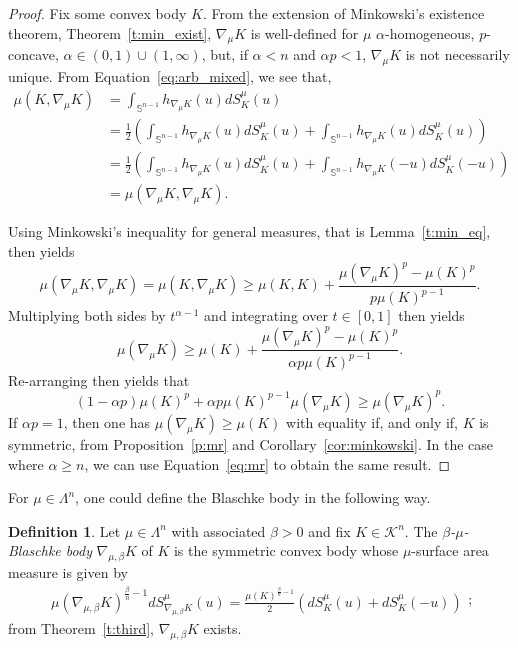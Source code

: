 \documentclass[11pt]{amsart}
\theoremstyle{definition}
\newtheorem{definition}[theorem]{Definition}
\theoremstyle{remark}
\numberwithin{equation}{section}
\newcommand{\s}{\mathbb{S}}
\newcommand{\conbod}{\mathcal{K}^n}
\begin{document}
\begin{proof} Fix some convex body $K$. From the extension of Minkowski's existence theorem, Theorem~\ref{t:min_exist}, $\nabla_\mu K$ is well-defined for $\mu$ $\alpha$-homogeneous, $p$-concave, $\alpha\in(0,1)\cup(1,\infty)$, but, if $\alpha<n$ and $\alpha p <1$, $\nabla_\mu K$ is not necessarily unique. 
From Equation~\ref{eq:arb_mixed}, we see that,
\begin{align*}\mu(K,\nabla_\mu K)&=\int_{\s^{n-1}}h_{\nabla_\mu K}(u)dS^{\mu}_{K}(u)
\\
&=\frac{1}{2}\left(\int_{\s^{n-1}}h_{\nabla_\mu K}(u)dS^{\mu}_{K}(u)+\int_{\s^{n-1}}h_{\nabla_\mu K}(u)dS^{\mu}_{K}(u)\right)
\\
&=\frac{1}{2}\left(\int_{\s^{n-1}}h_{\nabla_\mu K}(u)dS^{\mu}_{K}(u)+\int_{\s^{n-1}}h_{\nabla_\mu K}(-u)dS^{\mu}_{K}(-u)\right)
\\
&=\mu(\nabla_\mu K,\nabla_\mu K).
\end{align*}

\noindent Using Minkowski's inequality for general measures, that is Lemma~\ref{t:min_eq}, then yields
$$\mu(\nabla_\mu K,\nabla_\mu K)=\mu(K,\nabla_\mu K)\geq \mu(K,K) + \frac{\mu(\nabla_\mu K)^p -\mu(K)^p}{p\mu(K)^{p-1}}.$$
Multiplying both sides by $t^{\alpha-1}$ and integrating over $t\in[0,1]$ then yields
$$\mu(\nabla_\mu K)\geq \mu(K) + \frac{\mu(\nabla_\mu K)^p -\mu(K)^p}{\alpha p\mu(K)^{p-1}}.$$
Re-arranging then yields that
$$(1-\alpha p)\mu(K)^{p} + \alpha p\mu(K)^{p-1}\mu(\nabla_\mu K)\geq \mu(\nabla_\mu K)^p. $$
If $\alpha p =1$, then one has $\mu(\nabla_\mu K)\geq \mu(K)$ with equality if, and only if, $K$ is symmetric, from Proposition~\ref{p:mr} and Corollary~\ref{cor:minkowski}.
In the case where $\alpha\geq n$, we can use Equation~\ref{eq:mr} to obtain the same result.
\end{proof}

For $\mu\in\Lambda^n$, one could define the Blaschke body in the following way.
\begin{definition}
Let $\mu\in\Lambda^n$ with associated $\beta>0$ and fix $K\in\conbod.$ The \textit{$\beta$-$\mu$-Blaschke body} $\nabla_{\mu,\beta} K$ of $K$ is the symmetric convex body whose $\mu$-surface area measure is given by
\begin{equation}
\label{eq:blaschke}
\begin{split}
\mu\left({\nabla}_{\mu,\beta} K\right)^{\frac{\beta}{n}-1}dS^{\mu}_{\nabla_{\mu,\beta} K}(u)
=\frac{\mu(K)^{\frac{\beta}{n}-1}}{2}\left(dS^{\mu}_{K}(u) + dS^{\mu}_{K}(-u)\right)
\end{split};
\end{equation}
from Theorem~\ref{t:third}, ${\nabla}_{\mu,\beta} K$ exists.
\end{definition}
\end{document}
